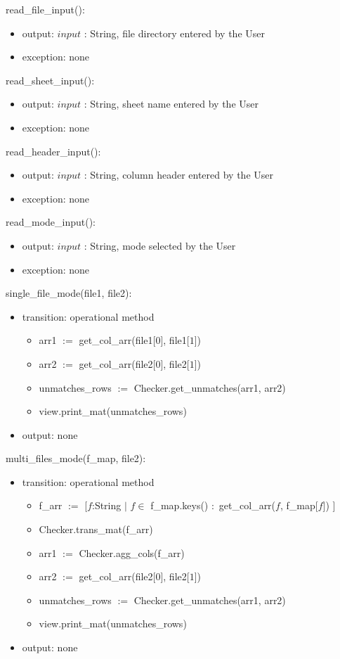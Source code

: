 \documentclass[12pt]{article}
\begin{document}
\noindent read\_file\_input():
\begin{itemize}
  \item output: $input$ : String, file directory entered by the User
  \item exception: none
\end{itemize}

\noindent read\_sheet\_input():
\begin{itemize}
  \item output: $input$ : String, sheet name entered by the User
  \item exception: none
\end{itemize}

\noindent read\_header\_input():
\begin{itemize}
  \item output: $input$ : String, column header entered by the User
  \item exception: none
\end{itemize}

\noindent read\_mode\_input():
\begin{itemize}
  \item output: $input$ : String, mode selected by the User
  \item exception: none
\end{itemize}

\noindent single\_file\_mode(file1, file2):
\begin{itemize}
  \item transition: operational method 
  \begin{itemize}[\null]
    \item arr1 $:=$ get\_col\_arr(file1[$0$], file1[$1$])
    \item arr2 $:=$ get\_col\_arr(file2[$0$], file2[$1$])
    \item unmatches\_rows $:=$ Checker.get\_unmatches(arr1, arr2)
    \item view.print\_mat(unmatches\_rows)
  \end{itemize}
  \item output: none
\end{itemize}

\noindent multi\_files\_mode(f\_map, file2):
\begin{itemize}
  \item transition: operational method 
  \begin{itemize}[\null]
    \item f\_arr $:=$ [$f$:String $|$ $f \in$ f\_map.keys() $:$ get\_col\_arr($f$, f\_map[$f$]) ]
    \item Checker.trans\_mat(f\_arr)
    \item arr1 $:=$ Checker.agg\_cols(f\_arr)
    \item arr2 $:=$ get\_col\_arr(file2[$0$], file2[$1$])
    \item unmatches\_rows $:=$ Checker.get\_unmatches(arr1, arr2)
    \item view.print\_mat(unmatches\_rows)
  \end{itemize}
  \item output: none
\end{itemize}
\end{document}
